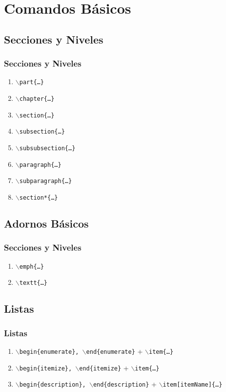 \documentclass[a4paper,slidestop,xcolor=pst,dvips,blue]{beamer}
\newcommand{\command}[1]{\texttt{$\backslash$#1\{\dots\}}}
\newcommand{\envCommand}[1]{\texttt{$\backslash$begin\{#1\}, $\backslash$end\{#1\}}}
\begin{document}
\section{Comandos Básicos}

\subsection{Secciones y Niveles}

\begin{frame}[c]
    \frametitle{Secciones y Niveles}
    \begin{enumerate}
        \item \command{part}
        \item \command{chapter}
        \item \command{section}
        \item \command{subsection}
        \item \command{subsubsection}
        \item \command{paragraph}
        \item \command{subparagraph}
        \item \command{section*}
    \end{enumerate}
\end{frame}

\subsection{Adornos Básicos}

\begin{frame}[c]
    \frametitle{Secciones y Niveles}
    \begin{enumerate}[<+->]
        \item \command{emph}
        \item \command{textt}
    \end{enumerate}
\end{frame}

\subsection{Listas}

\begin{frame}[c]
    \frametitle{Listas}
    \begin{enumerate}[<+->]
        \item \envCommand{enumerate} + \command{item}
        \item \envCommand{itemize} + \command{item}
        \item \envCommand{description} + \command{item[itemName]}
    \end{enumerate}
\end{frame}
\end{document}
